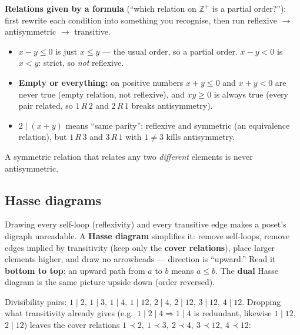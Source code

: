 \documentclass{fkt-notes}
\theoremstyle{definition}
\begin{document}
\textbf{Relations given by a formula} (``which relation on $\mathbb{Z}^+$
%
is a partial order?''): first rewrite each condition into something you
recognise, then run reflexive $\to$ antisymmetric $\to$ transitive.
\begin{itemize}[nosep]
  \item $x - y \le 0$ is just $x \le y$ --- the usual order, so a
        partial order. $x - y < 0$ is $x < y$: strict, so
        \emph{not} reflexive.
  \item \textbf{Empty or everything:} on positive numbers $x + y \le 0$
        and $x + y < 0$ are never true (empty relation, not reflexive),
        and $xy \ge 0$ is always true (every pair related, so
        $1\,R\,2$ and $2\,R\,1$ breaks antisymmetry).
  \item $2 \mid (x + y)$ means ``same parity'': reflexive and symmetric
        (an equivalence relation), but $1\,R\,3$ and $3\,R\,1$ with
        $1 \ne 3$ kills antisymmetry.
\end{itemize}
A symmetric relation that relates any two \emph{different} elements is
never antisymmetric.

\subsection{Hasse diagrams}
%
Drawing every self-loop (reflexivity) and every transitive edge makes a
poset's digraph unreadable. A \textbf{Hasse diagram} simplifies it:
remove self-loops, remove edges implied by transitivity (keep only the
\textbf{cover relations}), place larger elements higher, and draw no
arrowheads --- direction is ``upward.'' Read it \textbf{bottom to top}:
an upward path from $a$ to $b$ means $a\le b$. The \textbf{dual} Hasse
diagram is the same picture upside down (order reversed).

\begin{example}[6.1 Ex.~12: divisibility on $\{1,2,3,4,12\}$]
  Divisibility pairs: $1\mid2,\,1\mid3,\,1\mid4,\,1\mid12,\,2\mid4,\,
    2\mid12,\,3\mid12,\,4\mid12$. Dropping what transitivity already gives
  (e.g.\ $1\mid2\mid4\Rightarrow1\mid4$ is redundant, likewise $1\mid12$,
  $2\mid12$) leaves the cover relations
  $1\prec2,\ 1\prec3,\ 2\prec4,\ 3\prec12,\ 4\prec12$:
  \begin{center}
  \end{center}
\end{example}
\end{document}
